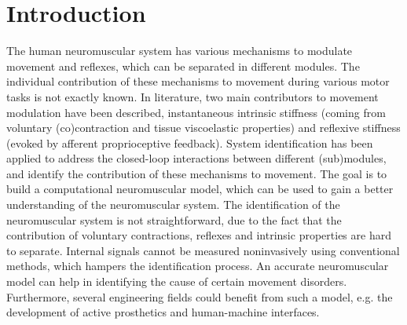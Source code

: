 \chapter{Introduction}

The human neuromuscular system has various mechanisms to modulate movement and reflexes, which can be separated in different modules. The individual contribution of these mechanisms to movement during various motor tasks is not exactly known. In literature, two main contributors to movement modulation have been described, instantaneous intrinsic stiffness (coming from voluntary (co)contraction and tissue viscoelastic properties) and reflexive stiffness (evoked by afferent proprioceptive feedback). System identification has been applied to address the closed-loop interactions between different (sub)modules, and identify the contribution of these mechanisms to movement. The goal is to build a computational neuromuscular model, which can be used to gain a better understanding of the neuromuscular system. The identification of the neuromuscular system is not straightforward, due to the fact that the contribution of voluntary contractions, reflexes and intrinsic properties are hard to separate. Internal signals cannot be measured noninvasively using conventional methods, which hampers the identification process. An accurate neuromuscular model can help in identifying the cause of certain movement disorders. Furthermore, several engineering fields could benefit from such a model, e.g. the development of active prosthetics and human-machine interfaces. 

%
%
%

